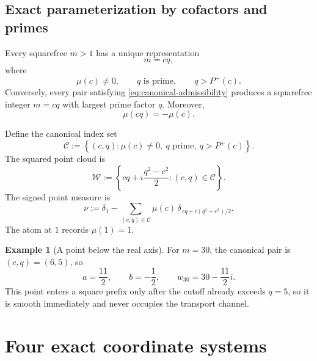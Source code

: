 \documentclass[11pt]{article}
\theoremstyle{definition}
\newtheorem{example}[theorem]{Example}
\theoremstyle{remark}
\newcommand{\Pplus}{P^{+}}
\newcommand{\1}{\mathbf{1}}
\begin{document}
\subsection{Exact parameterization by cofactors and primes}

Every squarefree $m>1$ has a unique representation
\begin{equation}
 m=cq,
 \label{eq:cq-general}
\end{equation}
where
\begin{equation}
 \mu(c)\ne0,
 \qquad
 q\text{ is prime},
 \qquad
 q>\Pplus(c).
 \label{eq:canonical-admissibility}
\end{equation}
Conversely, every pair satisfying \cref{eq:canonical-admissibility} produces a squarefree integer $m=cq$ with largest prime factor $q$.  Moreover,
\begin{equation}
 \mu(cq)=-\mu(c).
 \label{eq:canonical-sign}
\end{equation}

Define the canonical index set
\begin{equation}
 \mathscr C
 :=
 \left\{
 (c,q):
 \mu(c)\ne0,
 \ q\text{ prime},
 \ q>\Pplus(c)
 \right\}.
 \label{eq:canonical-index}
\end{equation}
The squared point cloud is
\begin{equation}
 \mathscr W
 :=
 \left\{
 cq+i\frac{q^2-c^2}{2}:(c,q)\in\mathscr C
 \right\}.
 \label{eq:canonical-cloud}
\end{equation}
The signed point measure is
\begin{equation}
 \nu
 :=
 \delta_1
 -
 \sum_{(c,q)\in\mathscr C}
 \mu(c)\,
 \delta_{\,cq+i(q^2-c^2)/2}.
 \label{eq:signed-measure}
\end{equation}
The atom at $1$ records $\mu(1)=1$.

\begin{example}[A point below the real axis]
For $m=30$, the canonical pair is $(c,q)=(6,5)$, so
\[
 a=\frac{11}{2},
 \qquad
 b=-\frac12,
 \qquad
 w_{30}=30-\frac{11}{2}i.
\]
This point enters a square prefix only after the cutoff already exceeds $q=5$, so it is smooth immediately and never occupies the transport channel.
\end{example}

\section{Four exact coordinate systems}
\label{sec:coordinates}
\end{document}
